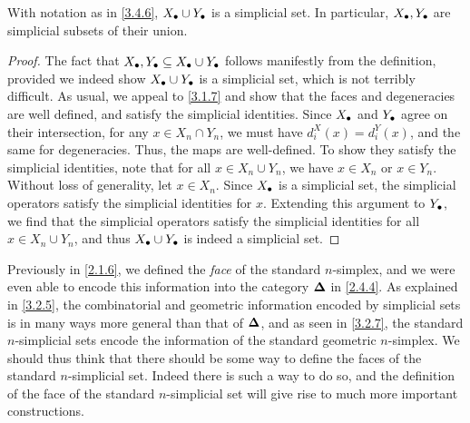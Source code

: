 \begin{claim}\label{3.4.7}
    With notation as in \cref{3.4.6}, $X_\bullet\cup Y_\bullet$ is a simplicial set. In particular, $X_\bullet,Y_\bullet$ are simplicial subsets of their union.
\end{claim}
\begin{proof}
    The fact that $X_\bullet,Y_\bullet\subseteq X_\bullet\cup Y_\bullet$ follows manifestly from the definition, provided we indeed show $X_\bullet\cup Y_\bullet$ is a simplicial set, which is not terribly difficult. As usual, we appeal to \cref{3.1.7} and show that the faces and degeneracies are well defined, and satisfy the simplicial identities. Since $X_\bullet$ and $Y_\bullet$ agree on their intersection, for any $x\in X_n\cap Y_n$, we must have $d_i^X(x)=d_i^Y(x)$, and the same for degeneracies. Thus, the maps are well-defined. To show they satisfy the simplicial identities, note that for all $x\in X_n\cup Y_n$, we have $x\in X_n$ or $x\in Y_n$. Without loss of generality, let $x\in X_n$. Since $X_\bullet$ is a simplicial set, the simplicial operators satisfy the simplicial identities for $x$. Extending this argument to $Y_\bullet$, we find that the simplicial operators satisfy the simplicial identities for all $x\in X_n\cup Y_n$, and thus $X_\bullet\cup Y_\bullet$ is indeed a simplicial set.
\end{proof}

Previously in \cref{2.1.6}, we defined the \emph{face} of the standard $n$-simplex, and we were even able to encode this information into the category $\boldsymbol{\Delta}$ in \cref{2.4.4}. As explained in \cref{3.2.5}, the combinatorial and geometric information encoded by simplicial sets is in many ways more general than that of $\boldsymbol{\Delta}$, and as seen in \cref{3.2.7}, the standard $n$-simplicial sets encode the information of the standard geometric $n$-simplex. We should thus think that there should be some way to define the faces of the standard $n$-simplicial set. Indeed there is such a way to do so, and the definition of the face of the standard $n$-simplicial set will give rise to much more important constructions.


